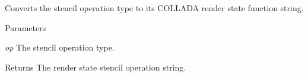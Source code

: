 \label{namespaceFUDaePassStateStencilOperation_a7e0fb155ca55db3a349b364755ba8cb8}
Converts the stencil operation type to its COLLADA render state function string. 
\begin{DoxyParams}{Parameters}
\item[{\em op}]The stencil operation type. \end{DoxyParams}
\begin{DoxyReturn}{Returns}
The render state stencil operation string. 
\end{DoxyReturn}
